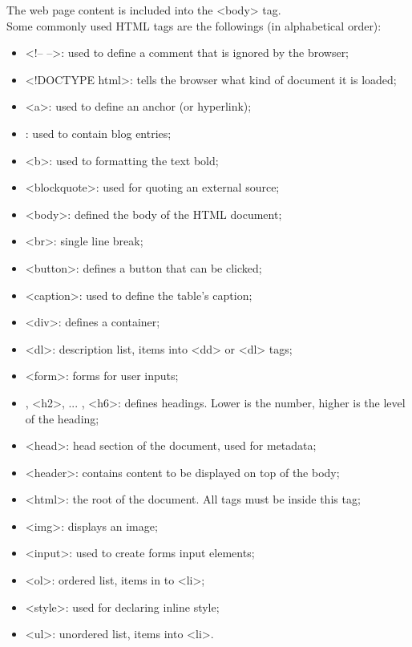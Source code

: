 The web page content is included into the <body> tag. \\
Some commonly used HTML tags are the followings (in alphabetical order):
\begin{itemize}
	\item <!-- -->: used to define a comment that is ignored by the browser;
	\item <!DOCTYPE html>: tells the browser what kind of document it is loaded;
	\item <a>:  used to define an anchor (or hyperlink);
	\item <article>: used to contain blog entries;
	\item <b>: used to formatting the text bold;
	\item <blockquote>: used for quoting an external source;
	\item <body>: defined the body of the HTML document;
	\item <br>: single line break;
	\item <button>: defines a button that can be clicked;
	\item <caption>: used to define the table's caption;
	\item <div>: defines a container;
	\item <dl>: description list, items into <dd> or <dl> tags;
	\item <form>: forms for user inputs;
	\item <h1>, <h2>, ... , <h6>: defines headings. Lower is the number, higher is the level of the heading;
	\item <head>:  head section of the document, used for metadata;
	\item <header>: contains content to be displayed on top of the body;
	\item <html>: the root of the document. All tags must be inside this tag;
	\item <img>: displays an image;
	\item <input>: used to create forms input elements;
	\item <ol>: ordered list, items in to <li>;
	\item <style>: used for declaring inline style;
	\item <ul>: unordered list, items into <li>.
\end{itemize}

